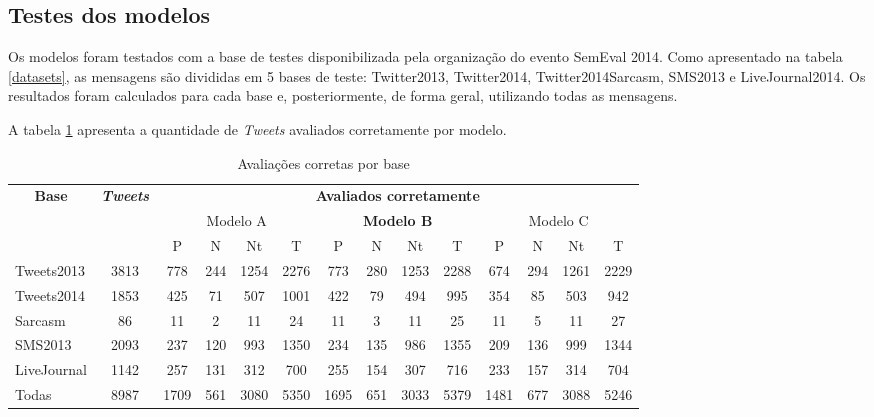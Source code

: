 \documentclass[12pt]{article}
\begin{document}
\subsection{Testes dos modelos}

Os modelos foram testados com a base de testes disponibilizada pela organização do evento SemEval 2014. Como apresentado na tabela \ref{datasets}, as mensagens são divididas em 5 bases de teste: Twitter2013, Twitter2014, Twitter2014Sarcasm, SMS2013 e LiveJournal2014. Os resultados foram calculados para cada base e, posteriormente, de forma geral, utilizando todas as mensagens.

A tabela \ref{correctEvaluations} apresenta a quantidade de \emph{Tweets} avaliados corretamente por modelo. 

\begin{table}[H]
\centering
\begin{adjustwidth}{-1.5cm}{}
\begin{tabular}{lccccccccccccc}
\multicolumn{1}{c}{\textbf{Base}} & \textit{\textbf{Tweets}} & \multicolumn{12}{c}{\textbf{Avaliados corretamente}} \\
 & \multicolumn{1}{l}{} & \multicolumn{4}{c}{Modelo A} & \multicolumn{4}{c}{\textbf{Modelo B}} & \multicolumn{4}{c}{Modelo C} \\
 & \multicolumn{1}{l}{} & \multicolumn{1}{c|}{P} & \multicolumn{1}{c|}{N} & \multicolumn{1}{c|}{Nt} & T & \multicolumn{1}{c|}{P} & \multicolumn{1}{c|}{N} & \multicolumn{1}{c|}{Nt} & T & \multicolumn{1}{c|}{P} & \multicolumn{1}{c|}{N} & \multicolumn{1}{c|}{Nt} & T \\
Tweets2013 & 3813 & 778 & 244 & 1254 & 2276 & 773 & 280 & 1253 & 2288 & 674 & 294 & 1261 & 2229 \\ \hline
Tweets2014 & 1853 & 425 & 71 & 507 & 1001 & 422 & 79 & 494 & 995 & 354 & 85 & 503 & 942 \\ \hline
Sarcasm & 86 & 11 & 2 & 11 & 24 & 11 & 3 & 11 & 25 & 11 & 5 & 11 & 27 \\ \hline
SMS2013 & 2093 & 237 & 120 & 993 & 1350 & 234 & 135 & 986 & 1355 & 209 & 136 & 999 & 1344 \\ \hline
LiveJournal & 1142 & 257 & 131 & 312 & 700 & 255 & 154 & 307 & 716 & 233 & 157 & 314 & 704 \\ \hline
Todas & 8987 & 1709 & 561 & 3080 & 5350 & 1695 & 651 & 3033 & 5379 & 1481 & 677 & 3088 & 5246\\ \hline
\end{tabular}
\caption{Avaliações corretas por base}
\label{correctEvaluations}
\end{adjustwidth}
\end{table}
\end{document}
